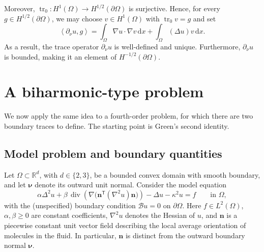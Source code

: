 \documentclass[11pt,a4paper]{article}
\newcommand{\Om}{\Omega}
\newcommand{\dd}{\,\mathrm{d}}
\newcommand{\tr}{\operatorname{tr}}
\newcommand{\Div}{\operatorname{div}}
\newcommand{\grad}{\nabla}
\newcommand{\dual}[2]{\left\langle #1,#2\right\rangle}
\begin{document}
Moreover, $\tr_0:H^1(\Om)\to H^{1/2}(\partial\Om)$ is surjective. Hence,
for every $g\in H^{1/2}(\partial\Om)$, we may choose $v\in H^1(\Om)$
with $\tr_0v=g$ and set
\[
    \dual{\partial_\nu u}{g}
      =\int_\Om\grad u\cdot\grad v\dd x
        +\int_\Om(\Delta u)v\dd x.
\]
As a result, the trace operator $\partial_\nu u$ is well-defined and unique. Furthermore, $\partial_\nu u$ is bounded, making it an element of $H^{-1/2}(\partial\Om).$



\newpage

\section{A biharmonic-type problem}

We now apply the same idea to a fourth-order problem, for which there are
two boundary traces to define. The starting point is Green's second identity.

\subsection{Model problem and boundary quantities}

Let $\Om\subset\mathbb R^d$, with $d\in\{2,3\}$, be a bounded convex
domain with smooth boundary, and let $\boldsymbol\nu$ denote its outward
unit normal. Consider the model equation
\begin{equation}\label{eq:biharmonic-model}
    \alpha\Delta^2u
      +\beta\,\Div\!\left(\grad\bigl(\mathbf n^{\mathsf T}
                   (\nabla^2u)\mathbf n\bigr)\right)
      -\Delta u-\kappa^2u=f
    \qquad\text{in }\Om,
\end{equation}
with the (unspecified) boundary condition $\mathcal Bu=0$ on $\partial\Om$.
Here $f\in L^2(\Om)$, $\alpha,\beta\geq0$ are constant coefficients,
$\nabla^2u$ denotes the Hessian of $u$, and $\mathbf n$ is a piecewise
constant unit vector field describing the local average orientation of
molecules in the fluid. In particular, $\mathbf n$ is distinct from the
outward boundary normal $\boldsymbol\nu$.
\end{document}
